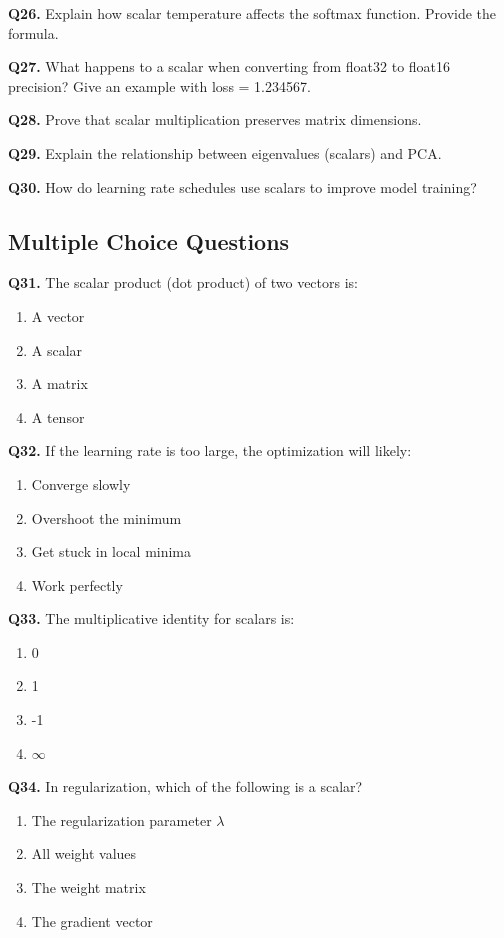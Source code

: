 \documentclass[11pt,a4paper]{article}
\begin{document}
\textbf{Q26.} Explain how scalar temperature affects the softmax function. Provide the formula.

\textbf{Q27.} What happens to a scalar when converting from float32 to float16 precision? Give an example with loss = 1.234567.

\textbf{Q28.} Prove that scalar multiplication preserves matrix dimensions.

\textbf{Q29.} Explain the relationship between eigenvalues (scalars) and PCA.

\textbf{Q30.} How do learning rate schedules use scalars to improve model training?

\subsection{Multiple Choice Questions}

\textbf{Q31.} The scalar product (dot product) of two vectors is:
\begin{enumerate}[label=(\alph*)]
    \item A vector
    \item A scalar
    \item A matrix
    \item A tensor
\end{enumerate}

\textbf{Q32.} If the learning rate is too large, the optimization will likely:
\begin{enumerate}[label=(\alph*)]
    \item Converge slowly
    \item Overshoot the minimum
    \item Get stuck in local minima
    \item Work perfectly
\end{enumerate}

\textbf{Q33.} The multiplicative identity for scalars is:
\begin{enumerate}[label=(\alph*)]
    \item 0
    \item 1
    \item -1
    \item $\infty$
\end{enumerate}

\textbf{Q34.} In regularization, which of the following is a scalar?
\begin{enumerate}[label=(\alph*)]
    \item The regularization parameter $\lambda$
    \item All weight values
    \item The weight matrix
    \item The gradient vector
\end{enumerate}
\end{document}
